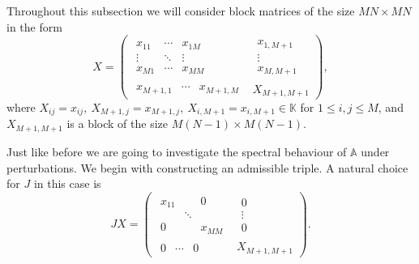 \documentclass[14pt,a4paper]{extarticle}
\theoremstyle{definition}
\begin{document}
Throughout this subsection
    we will consider block matrices
    of the size \( {MN}{\times}{MN} \)
    in the form
    \[
    X =
        \left(\begin{array}{c|c}
            \begin{matrix}
                x_{11} & \cdots & x_{1M} \\
                \vdots & \ddots & \vdots \\
                x_{M1} & \cdots & x_{MM}
            \end{matrix} &
            \begin{matrix}
                x_{1,M+1} \\
                \vdots \\
                x_{M,M+1}
            \end{matrix} \\ \hline
            \begin{matrix}
                x_{M+1,1} &
                \cdots &
                x_{M+1,M}
            \end{matrix} &
            X_{M+1,M+1}
        \end{array}\right),
    \]
where
\( X_{ij}      {=} x_{ij},
 \ X_{M{+}1,j} {=} x_{M{+}1,j},
 \ X_{i,M{+}1} {=} x_{i,M{+}1} \in \mathbb{K} \)
for \( 1 \leq {i,j} \leq M \),
and
\( X_{M{+}1,M{+}1} \) is a block of the size \( {M(N{-}1){\times}M(N-1)} \).

Just like before we are going to investigate
    the spectral behaviour of \( \mathbb{A} \) under perturbations.
We begin with constructing an admissible triple.
A natural choice for \( J \) in this case is
\[
        J X =
        \left(\begin{array}{c|c}
            \begin{matrix}
                x_{11} &  & 0 \\
                 & \ddots &  \\
                0 &  & x_{MM}
            \end{matrix} &
            \begin{matrix}
                0 \\
                \vdots \\
                0
            \end{matrix} \\ \hline
            \begin{matrix}
                0 & \cdots & 0
            \end{matrix} &
            X_{M+1,M+1}
        \end{array}\right).
\]
\end{document}
